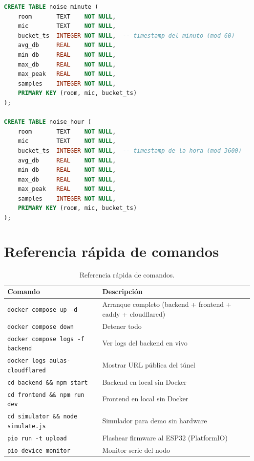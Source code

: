 \documentclass[11pt,a4paper,openany]{report}
\begin{document}
\begin{lstlisting}[language=SQL, caption={Tablas agregadas del rollup}]
CREATE TABLE noise_minute (
    room       TEXT    NOT NULL,
    mic        TEXT    NOT NULL,
    bucket_ts  INTEGER NOT NULL,  -- timestamp del minuto (mod 60)
    avg_db     REAL    NOT NULL,
    min_db     REAL    NOT NULL,
    max_db     REAL    NOT NULL,
    max_peak   REAL    NOT NULL,
    samples    INTEGER NOT NULL,
    PRIMARY KEY (room, mic, bucket_ts)
);

CREATE TABLE noise_hour (
    room       TEXT    NOT NULL,
    mic        TEXT    NOT NULL,
    bucket_ts  INTEGER NOT NULL,  -- timestamp de la hora (mod 3600)
    avg_db     REAL    NOT NULL,
    min_db     REAL    NOT NULL,
    max_db     REAL    NOT NULL,
    max_peak   REAL    NOT NULL,
    samples    INTEGER NOT NULL,
    PRIMARY KEY (room, mic, bucket_ts)
);
\end{lstlisting}

\chapter{Referencia r\'apida de comandos}

\begin{table}[H]
\centering
{}
\begin{tabularx}{\textwidth}{l X}
\toprule
\rowcolor{TableHead}
\textbf{Comando} & \textbf{Descripci\'on} \\ \midrule
\texttt{docker compose up -d}            & Arranque completo (backend + frontend + caddy + cloudflared) \\
\texttt{docker compose down}             & Detener todo \\
\texttt{docker compose logs -f backend}  & Ver logs del backend en vivo \\
\texttt{docker logs aulas-cloudflared}   & Mostrar URL p\'ublica del t\'unel \\
\texttt{cd backend \&\& npm start}       & Backend en local sin Docker \\
\texttt{cd frontend \&\& npm run dev}    & Frontend en local sin Docker \\
\texttt{cd simulator \&\& node simulate.js} & Simulador para demo sin hardware \\
\texttt{pio run -t upload}                & Flashear firmware al ESP32 (PlatformIO) \\
\texttt{pio device monitor}               & Monitor serie del nodo \\ \bottomrule
\end{tabularx}
\caption{Referencia r\'apida de comandos.}
\end{table}
\end{document}
